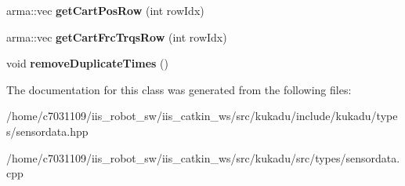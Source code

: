 \begin{DoxyCompactItemize}
\item 
\hypertarget{classkukadu_1_1SensorData_abd2fbd3a0e16a9537a07c532cd0b125e}{arma\-::vec {\bfseries get\-Cart\-Pos\-Row} (int row\-Idx)}\label{classkukadu_1_1SensorData_abd2fbd3a0e16a9537a07c532cd0b125e}

\item 
\hypertarget{classkukadu_1_1SensorData_af0d6d78e9d54ebcbc635e09e0ba9a707}{arma\-::vec {\bfseries get\-Cart\-Frc\-Trqs\-Row} (int row\-Idx)}\label{classkukadu_1_1SensorData_af0d6d78e9d54ebcbc635e09e0ba9a707}

\item 
\hypertarget{classkukadu_1_1SensorData_a0efd2b1e84f5fccd65f105625803f75b}{void {\bfseries remove\-Duplicate\-Times} ()}\label{classkukadu_1_1SensorData_a0efd2b1e84f5fccd65f105625803f75b}

\end{DoxyCompactItemize}


The documentation for this class was generated from the following files\-:\begin{DoxyCompactItemize}
\item 
/home/c7031109/iis\-\_\-robot\-\_\-sw/iis\-\_\-catkin\-\_\-ws/src/kukadu/include/kukadu/types/sensordata.\-hpp\item 
/home/c7031109/iis\-\_\-robot\-\_\-sw/iis\-\_\-catkin\-\_\-ws/src/kukadu/src/types/sensordata.\-cpp\end{DoxyCompactItemize}
